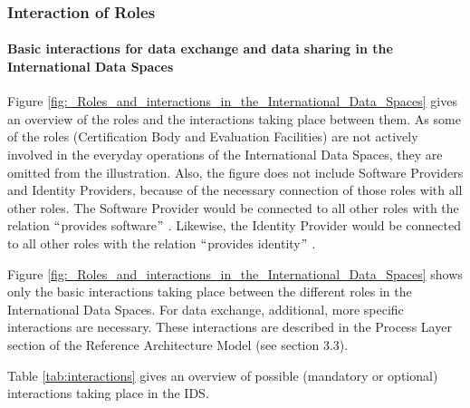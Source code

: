 \subsubsection*{Interaction of Roles }
\paragraph{Basic interactions for data exchange and data sharing in the International Data Spaces}
Figure \ref{fig:_Roles_and_interactions_in_the_International_Data_Spaces} gives an overview of the roles and the interactions taking place between them. As some of the roles (Certification Body and Evaluation Facilities) are not actively involved in the everyday operations of the International Data Spaces, they are omitted from the illustration. Also, the figure does not include Software Providers and Identity Providers, because of the necessary connection of those roles with all other roles. The Software Provider would be connected to all other roles with the relation $``$provides software$"$ . Likewise, the Identity Provider would be connected to all other roles with the relation $``$provides identity$"$ .

Figure \ref{fig:_Roles_and_interactions_in_the_International_Data_Spaces} shows only the basic interactions taking place between the different roles in the International Data Spaces. For data exchange, additional, more specific interactions are necessary. These interactions are described in the Process Layer section of the Reference Architecture Model (see section 3.3). %

Table \ref{tab:interactions} gives an overview of possible (mandatory or optional) interactions taking place in the IDS. 





